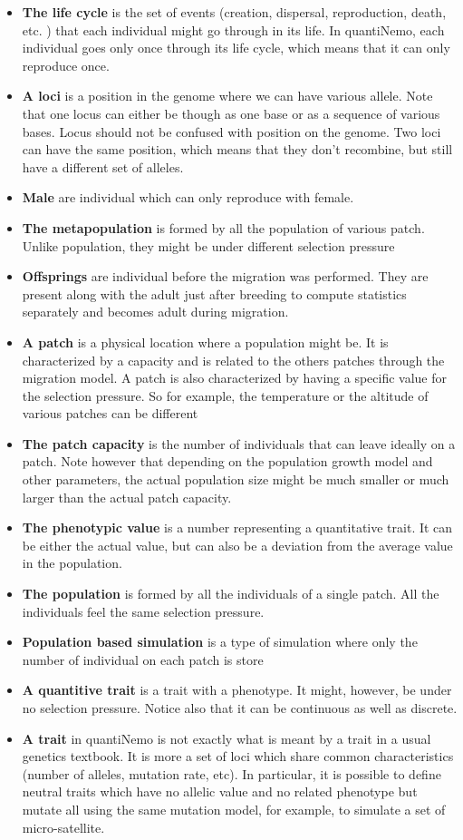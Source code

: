 \documentclass[letterpaper,12pt,oneside]{book}
\begin{document}
\begin{appendices}
\begin{itemize}
\item \textbf{The life cycle } is the set of events (creation, dispersal, reproduction, death, etc. ) that each individual might go through in its life. In quantiNemo, each individual goes only once through its life cycle, which means that it can only reproduce once. 
\item \textbf{A loci} is a position in the genome where we can have various allele. Note that one locus can either be though as one base or as a sequence of various bases. Locus should not be confused with position on the genome. Two loci can have the same position, which means that they don't recombine,  but still have a different set of alleles. 
\item \textbf{Male} are individual which can only reproduce with female. 
\item \textbf{The metapopulation} is formed by all the population of various patch. Unlike population, they might be under different selection pressure
\item \textbf{Offsprings} are individual before the migration was performed. They are present along with the adult just after breeding to compute statistics separately and becomes adult during migration. 
\item \textbf{A patch} is a physical location where a population might be. It is characterized by a capacity and is related to the others patches through the migration model. A patch is also characterized by having a specific value for the selection pressure. So for example, the temperature or the altitude of various patches can be different
\item \textbf{The patch capacity} is the number of individuals that can leave ideally on a patch. Note however that depending on the population growth model and other parameters, the actual population size might be much smaller or much larger than the actual patch capacity.
\item \textbf{The phenotypic value}  is a number representing a quantitative trait. It can be either the actual value, but can also be a deviation from the average value in the population. 
\item \textbf{The population} is formed by all the individuals of a single patch. All the individuals feel the same selection pressure.  
\item \textbf{Population based simulation} is a type of simulation where only the number of individual on each patch is store
\item \textbf{A quantitive trait} is a trait with a phenotype. It might, however, be under no selection pressure. Notice also that it can be continuous as well as discrete. 
\item \textbf{A trait} in quantiNemo is not exactly what is meant by a trait in a usual genetics textbook. It is more a set of loci which share common characteristics (number of alleles, mutation rate, etc). In particular, it is possible to define neutral traits which have no allelic value and no related phenotype but mutate all using the same mutation model, for example, to simulate a set of micro-satellite. 
\end{itemize}
\end{appendices}
\end{document}
